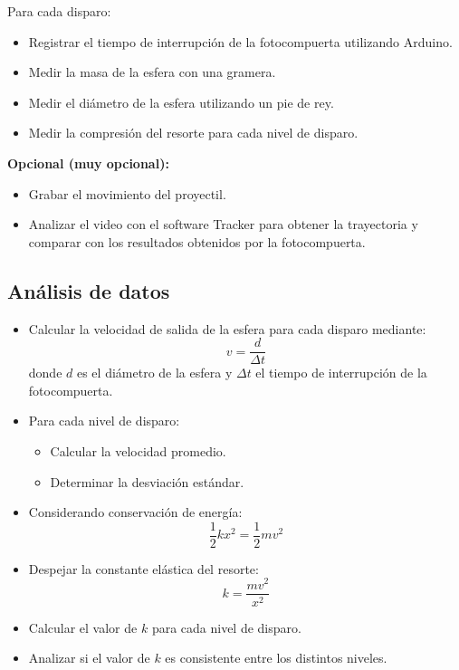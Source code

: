 Para cada disparo:

\begin{itemize}
\item Registrar el tiempo de interrupción de la fotocompuerta utilizando Arduino.
\item Medir la masa de la esfera con una gramera.
\item Medir el diámetro de la esfera utilizando un pie de rey.
\item Medir la compresión del resorte para cada nivel de disparo.
\end{itemize}

\textbf{Opcional (muy opcional):}

\begin{itemize}
\item Grabar el movimiento del proyectil.
\item Analizar el video con el software Tracker para obtener la trayectoria y comparar con los resultados obtenidos por la fotocompuerta.
\end{itemize}

\subsection*{Análisis de datos}

\begin{itemize}
\item Calcular la velocidad de salida de la esfera para cada disparo mediante:
\begin{equation}
v = \frac{d}{\Delta t}
\end{equation}
donde $d$ es el diámetro de la esfera y $\Delta t$ el tiempo de interrupción de la fotocompuerta.

\item Para cada nivel de disparo:
  \begin{itemize}
  \item Calcular la velocidad promedio.
  \item Determinar la desviación estándar.
  \end{itemize}

\item Considerando conservación de energía:
\begin{equation}
\frac{1}{2} k x^2 = \frac{1}{2} m v^2
\end{equation}

\item Despejar la constante elástica del resorte:
\begin{equation}
k = \frac{m v^2}{x^2}
\end{equation}

\item Calcular el valor de $k$ para cada nivel de disparo.

\item Analizar si el valor de $k$ es consistente entre los distintos niveles.
\end{itemize}


